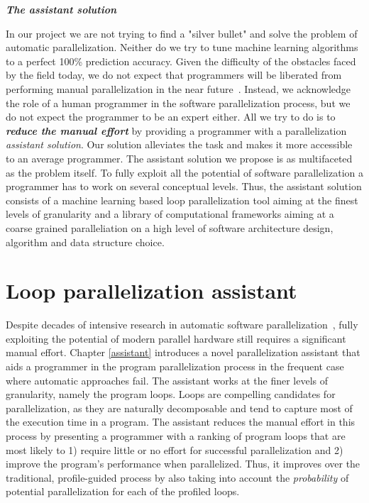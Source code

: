 \begin{center}
\textbf{\large \textit{The assistant solution}}
\end{center}
\quad In our project we are not trying to find a "silver bullet" and solve the problem of automatic parallelization. Neither do we try to tune machine learning algorithms to a perfect 100\% prediction accuracy. Given the difficulty of the obstacles faced by the field today, we do not expect that programmers will be liberated from performing manual parallelization in the near future~\cite{Larsen:2012:PML:2410141.2410600}. Instead, we acknowledge the role of a human programmer in the software parallelization process, but we do not expect the programmer to be an expert either. All we try to do is to \textit{\textbf{reduce the manual effort}} by providing a programmer with a parallelization \textit{assistant solution}. Our solution alleviates the task and makes it more accessible to an average programmer. The assistant solution we propose is as multifaceted as the problem itself. To fully exploit all the potential of software parallelization a programmer has to work on several conceptual levels. Thus, the assistant solution consists of a machine learning based loop parallelization tool \cite{assistant-aiseps} aiming at the finest levels of granularity and a library of computational frameworks \cite{frameworks-repo} aiming at a coarse grained paralleliation on a high level of software architecture design, algorithm and data structure choice.
\section{Loop parallelization assistant}
\label{introduction_assistant}
\quad Despite decades of intensive research in automatic software
parallelization~\cite{6813266}, fully exploiting the potential of modern parallel hardware still requires a significant manual effort. Chapter \ref{assistant} introduces a novel parallelization assistant that aids a programmer in the program parallelization process in the frequent case where automatic approaches fail. The assistant works at the finer levels of granularity, namely the program loops. Loops are compelling candidates for parallelization, as they are naturally decomposable and tend to capture most of the execution time in a program. The assistant reduces the manual effort in this process by presenting a programmer with a ranking of program loops that are most likely to 1) require little or no effort for successful parallelization and 2) improve the program's performance when parallelized. Thus, it improves over the traditional, profile-guided process by also taking into account the \emph{probability} of potential parallelization for each of the profiled loops.


